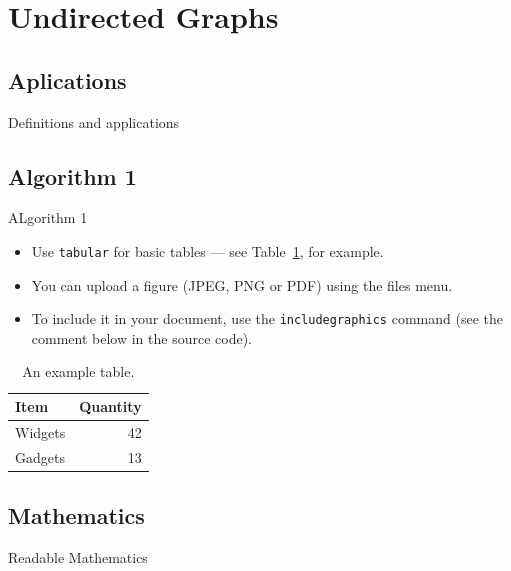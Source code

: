 \documentclass{beamer}
\begin{document}
\section{Undirected Graphs}

\subsection{Aplications}
\begin{frame}{Definitions and applications}
\end{frame}
\subsection{Algorithm 1}

\begin{frame}{ALgorithm 1}

\begin{itemize}
\item Use \texttt{tabular} for basic tables --- see Table~\ref{tab:widgets}, for example.
\item You can upload a figure (JPEG, PNG or PDF) using the files menu. 
\item To include it in your document, use the \texttt{includegraphics} command (see the comment below in the source code).
\end{itemize}


\begin{table}
\centering
\begin{tabular}{l|r}
Item & Quantity \\\hline
Widgets & 42 \\
Gadgets & 13
\end{tabular}
\caption{\label{tab:widgets}An example table.}
\end{table}

\end{frame}

\subsection{Mathematics}

\begin{frame}{Readable Mathematics}

\end{frame}
\end{document}
